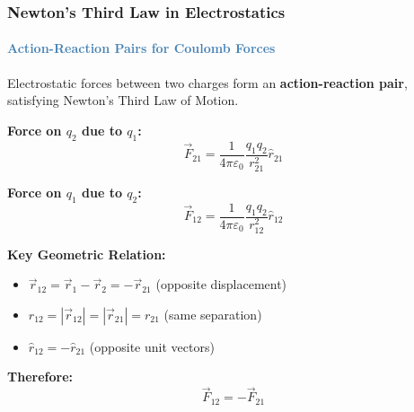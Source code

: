 \begin{frame}
\frametitle{\textsf{\textbf{Newton's Third Law} in Electrostatics}}
\framesubtitle{\textcolor{steelblue}{Action-Reaction Pairs for Coulomb Forces}}

\vspace{-0.05cm}

\begin{keybox}
\vspace{0.1cm}
Electrostatic forces between two charges form an \textbf{action-reaction pair}, satisfying Newton's Third Law of Motion.
\vspace{0.05cm}
\end{keybox}

\vspace{0.25cm}

\begin{examplebox}
\vspace{0.15cm}

\textbf{Force on $q_2$ due to $q_1$:}
\begin{equation*}
\vec{F}_{21} = \frac{1}{4\pi\varepsilon_0} \frac{q_1 q_2}{r_{21}^2} \hat{r}_{21}
\end{equation*}

\textbf{Force on $q_1$ due to $q_2$:}
\begin{equation*}
\vec{F}_{12} = \frac{1}{4\pi\varepsilon_0} \frac{q_1 q_2}{r_{12}^2} \hat{r}_{12}
\end{equation*}

\vspace{0.2cm}

\textbf{Key Geometric Relation:}
\begin{itemize}
    \item $\vec{r}_{12} = \vec{r}_1 - \vec{r}_2 = -\vec{r}_{21}$ \quad (opposite displacement)
    \item $r_{12} = |\vec{r}_{12}| = |\vec{r}_{21}| = r_{21}$ \quad (same separation)
    \item $\hat{r}_{12} = -\hat{r}_{21}$ \quad (opposite unit vectors)
\end{itemize}

\vspace{0.2cm}

\textbf{Therefore:}
\begin{equation*}
\boxed{\vec{F}_{12} = -\vec{F}_{21}}
\end{equation*}
\end{examplebox}


\end{frame}
